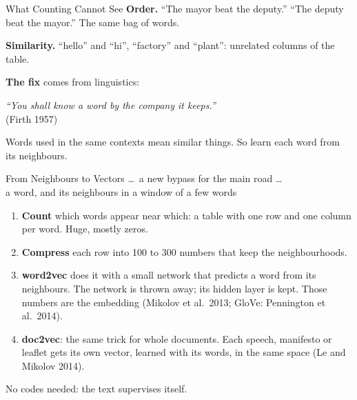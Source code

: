 \documentclass[svgnames,x11names,dvipsnames]{beamer}
\newcommand{\new}[1]{#1}
\begin{document}
\begin{frame}{\new{What Counting Cannot See}}
\small
\textbf{Order.} \new{``The mayor beat the deputy.'' ``The deputy beat the mayor.''} The same bag of words.

\vspace{0.4cm}
\textbf{Similarity.} \new{``hello'' and ``hi'', ``factory'' and ``plant''}: unrelated columns of the table.

\vspace{0.4cm}
\textbf{The fix} comes from linguistics:

\vspace{0.3cm}
\centering
\textit{``You shall know a word by the company it keeps.''}\\[0.1cm]
{\footnotesize (Firth 1957)}

\vspace{0.4cm}
\raggedright
Words used in the same contexts mean similar things. So learn each word from its neighbours.
\end{frame}

\begin{frame}{\new{From Neighbours to Vectors}}
\footnotesize
\centering
{\normalsize \dots\ a new \colorbox{titleblue!15}{bypass} for the main road \dots}\\[0.1cm]
{\scriptsize a word, and its neighbours in a window of a few words}

\vspace{0.4cm}
\raggedright
\begin{enumerate}
    \setlength{\itemsep}{5pt}
    \item \textbf{Count} which words appear near which: a table with one row and one column per word. Huge, mostly zeros.
    \item \textbf{Compress} each row into 100 to 300 numbers that keep the neighbourhoods.
    \item \textbf{word2vec} does it with a small network that predicts a word from its neighbours. The network is thrown away; its hidden layer is kept. Those numbers are the embedding (Mikolov et al.\ 2013; GloVe: Pennington et al.\ 2014).
    \item \new{\textbf{doc2vec}: the same trick for whole documents. Each speech, manifesto or leaflet gets its own vector, learned with its words, in the same space (Le and Mikolov 2014).}
\end{enumerate}

\vspace{0.2cm}
No codes needed: the text supervises itself.
\end{frame}
\end{document}
